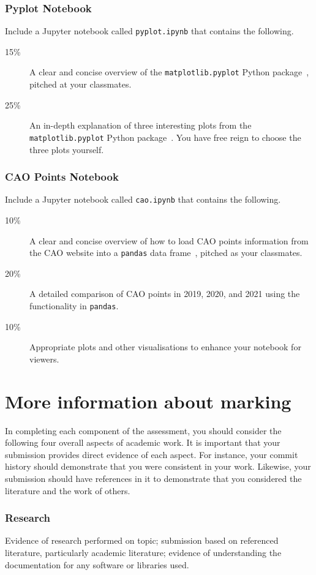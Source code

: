 \documentclass[a4paper, 12pt]{scrartcl}
\begin{document}
  \subsubsection*{Pyplot Notebook}
  Include a Jupyter notebook called \texttt{pyplot.ipynb} that contains the following.
  \begin{description}
    \item[15\%] A clear and concise overview of the \texttt{matplotlib.pyplot} Python package~\cite{pyplot}, pitched at your classmates.
    \item[25\%] An in-depth explanation of three interesting plots from the \texttt{matplotlib.pyplot} Python package~\cite{pyplot}. You have free reign to choose the three plots yourself.
  \end{description}

  \subsubsection*{CAO Points Notebook}
  Include a Jupyter notebook called \texttt{cao.ipynb} that contains the following.
  \begin{description}
    \item[10\%] A clear and concise overview of how to load CAO points information from the CAO website into a \texttt{pandas} data frame~\cite{pandas}, pitched as your classmates.
    \item[20\%] A detailed comparison of CAO points in 2019, 2020, and 2021 using the functionality in \texttt{pandas}.
    \item[10\%] Appropriate plots and other visualisations to enhance your notebook for viewers.
  \end{description}

  \section*{More information about marking}
    In completing each component of the assessment, you should consider the following four overall aspects of academic work.
    It is important that your submission provides direct evidence of each aspect.
    For instance, your commit history should demonstrate that you were consistent in your work.
    Likewise, your submission should have references in it to demonstrate that you considered the literature and the work of others.
  
    \subsubsection*{Research}
    Evidence of research performed on topic; submission based on referenced literature, particularly academic literature; evidence of understanding the documentation for any software or libraries used.
\end{document}
